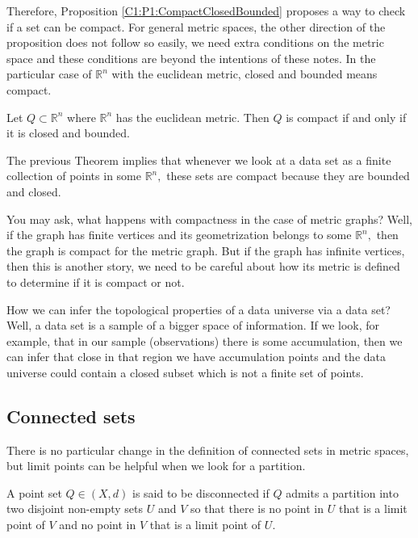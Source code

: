 \documentclass[
	fontsize=10pt, %
	twoside=false, %
	secnumdepth=1, %
]{kaobook}
\begin{document}
Therefore, Proposition \ref{C1:P1:CompactClosedBounded} proposes a way to check if a set can be compact. For general metric spaces, the other direction of the proposition does not follow so easily, we need extra conditions on the metric space and these conditions are beyond the intentions of these notes. In the particular case of $\mathbb{R}^n$ with the euclidean metric, closed and bounded means compact.

\begin{theorem}
Let $Q\subset \mathbb{R}^n$ where $\mathbb{R}^n$ has the euclidean metric. Then $Q$ is compact if and only if it is closed and bounded.
\end{theorem}

The previous Theorem implies that whenever we look at a data set as a finite collection of points in some $\mathbb{R}^n,$ these sets are compact because they are bounded and closed.

You may ask, what happens with compactness in the case of metric graphs? Well, if the graph has finite vertices and its geometrization belongs to some $\mathbb{R}^n,$ then the graph is compact for the metric graph. But if the graph has infinite vertices, then this is another story, we need to be careful about how its metric is defined to determine if it is compact or not.

How we can infer the topological properties of a data universe via a data set? Well, a data set is a sample of a bigger space of information. If we look, for example, that in our sample (observations) there is some accumulation, then we can infer that close in that region we have accumulation points and the data universe could contain a closed subset which is not a finite set of points.

\subsection{Connected sets}

There is no particular change in the definition of connected sets in metric spaces, but limit points can be helpful when we look for a partition.

\begin{definition}
A point set $Q\in (X,d)$ is said to be disconnected if $Q$ admits a partition into two disjoint non-empty sets $U$ and $V$ so that there is no point in $U$ that is a limit point of $V$ and no point in $V$ that is a limit point of $U.$
\end{definition}
\end{document}
